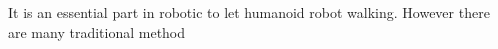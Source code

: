 It is an essential part in robotic to let humanoid robot walking. However there are many traditional method 